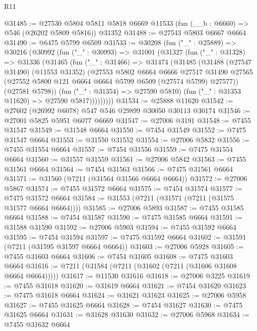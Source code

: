 \begin{lexlean}{R11}
\begin{coremodule}
@31485 := @27530
    @5804
    @5811
    @5818
    @6669
    @11533
    (fun (__b : @6660) => @546 (@26202 @5809 @5816))
    @31352
@31488 := @27543 @5803 @6667 @6664
@31490 := @6475 @5799 @6509
@31533 := @30208
    (fun ("_" : @25889) =>
    @30216
      (@30992
        (fun ("_" : @30993) =>
        @31001
          (@31327
            (fun ("_" : @31328) =>
            @31336
              (@31465
                (fun ("_" : @31466) =>
                @31474
                  (@31485
                    (@31488
                      (@27547 @31490)
                      (@11553 @31352)
                      (@27553
                        @5802
                        @6664
                        @6666
                        @27517
                        @31490
                        @27565
                        (@27552 @5800 @121 @6664 @6664 @5799 @6509 (@27574 @5799) @27577))
                      (@27581 @5798))
                    (fun ("_" : @31354) => @27590 @5810)
                    (fun ("_" : @31353 @11620) => @27590 @5817)))))))))
@31534 := @25888 @11620
@31542 := @27602 (@26992 @6078) @547 @546 @29899 @30050 @30113 @30174
@31546 := @27001 @5825 @5951 @6077 @6669
@31547 := @27006 @3191
@31548 := @7455 @31547
@31549 := @31548 @6664
@31550 := @7454 @31549
@31552 := @7475 @31547 @6664
@31553 := @31550 @31552
@31554 := @27006 @5832
@31556 := @7455 @31554 @6664
@31557 := @7454 @31556
@31559 := @7475 @31554 @6664
@31560 := @31557 @31559
@31561 := @27006 @5842
@31563 := @7455 @31561 @6664
@31564 := @7454 @31563
@31566 := @7475 @31561 @6664
@31571 := @31560 (@7211 (@31564 @31566 @6664 @6664))
@31572 := @27006 @5867
@31574 := @7455 @31572 @6664
@31575 := @7454 @31574
@31577 := @7475 @31572 @6664
@31584 := @31553 (@7211 (@31571 (@7211 (@31575 @31577 @6664 @6664))))
@31585 := @27006 @5893
@31587 := @7455 @31585 @6664
@31588 := @7454 @31587
@31590 := @7475 @31585 @6664
@31591 := @31588 @31590
@31592 := @27006 @5903
@31594 := @7455 @31592 @6664
@31595 := @7454 @31594
@31597 := @7475 @31592 @6664
@31602 := @31591 (@7211 (@31595 @31597 @6664 @6664))
@31603 := @27006 @5928
@31605 := @7455 @31603 @6664
@31606 := @7454 @31605
@31608 := @7475 @31603 @6664
@31616 := @7211 (@31584 (@7211 (@31602 (@7211 (@31606 @31608 @6664 @6664)))))
@31617 := @11530 @31616
@31618 := @27006 @3225
@31619 := @7455 @31618
@31620 := @31619 @6664
@31621 := @7454 @31620
@31623 := @7475 @31618 @6664
@31624 := @31621 @31623
@31625 := @27006 @5958
@31627 := @7455 @31625 @6664
@31628 := @7454 @31627
@31630 := @7475 @31625 @6664
@31631 := @31628 @31630
@31632 := @27006 @5968
@31634 := @7455 @31632 @6664

\end{coremodule}
\end{lexlean}
